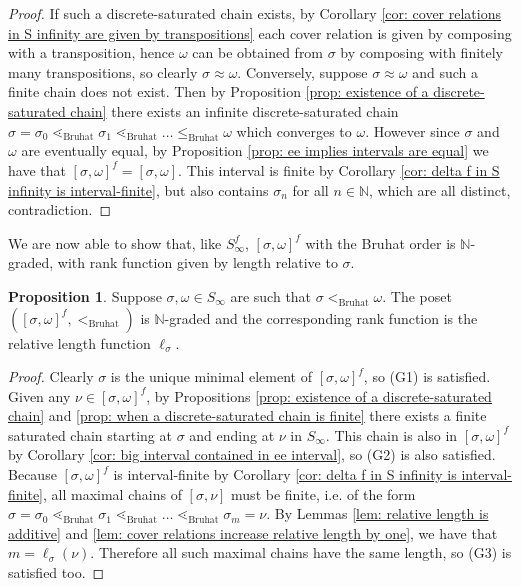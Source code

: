 \documentclass[oneside,11pt,reqno]{amsart}
\newcommand{\nn}{\ensuremath{\mathbb{N}}}
\theoremstyle{definition}
\newtheorem{proof techniques}{Proof Techniques}
\newtheorem{proposition}{Proposition}
\begin{document}
\begin{proof}
If such a discrete-saturated chain exists, by Corollary \ref{cor: cover relations in S infinity are given by transpositions} each cover relation is given by composing with a transposition, hence $\omega$ can be obtained from $\sigma$ by composing with finitely many transpositions, so clearly $\sigma \approx \omega$.
Conversely, suppose $\sigma \approx \omega$ and such a finite chain does not exist. Then by Proposition \ref{prop: existence of a discrete-saturated chain} there exists an infinite discrete-saturated chain $\sigma  = \sigma_0 \lessdot_\text{Bruhat} \sigma_1 \lessdot_\text{Bruhat} \ldots \leq_\text{Bruhat} \omega$ which converges to $\omega$. However since $\sigma$ and $\omega$ are eventually equal, by Proposition \ref{prop: ee implies intervals are equal} we have that $[\sigma , \omega]^f = [\sigma , \omega]$. This interval is finite by Corollary \ref{cor: delta f in S infinity is interval-finite}, but also contains $\sigma_n$ for all $n \in \nn$, which are all distinct, contradiction. 
\end{proof}


We are now able to show that, like $S_\infty^f$, $[\sigma , \omega]^f$ with the Bruhat order is $\nn$-graded, with rank function given by length relative to $\sigma$. 

\begin{proposition}\label{prop: bruhat interval is graded}
    Suppose $\sigma , \omega \in S_\infty$ are such that $\sigma <_\text{Bruhat} \omega$. The poset $([\sigma , \omega]^f, <_\text{Bruhat})$ is $\nn$-graded and the corresponding rank function is the relative length function $\ell_\sigma$.   
\end{proposition}

\begin{proof}
Clearly $\sigma$ is the unique minimal element of $[\sigma , \omega]^f$, so (G1) is satisfied. Given any $\nu \in [\sigma , \omega]^f$, by Propositions \ref{prop: existence of a discrete-saturated chain} and \ref{prop: when a discrete-saturated chain is finite} there exists a finite saturated chain starting at $\sigma$ and ending at $\nu$ in $S_\infty$. This chain is also in $[\sigma , \omega]^f$ by Corollary \ref{cor: big interval contained in ee interval}, so (G2) is also satisfied. Because $[\sigma , \omega]^f$ is interval-finite by Corollary \ref{cor: delta f in S infinity is interval-finite}, all maximal chains of $[\sigma , \nu]$ must be finite, i.e. of the form $\sigma = \sigma_0 \lessdot_{\text{Bruhat}} \sigma_1 \lessdot_\text{Bruhat} \ldots \lessdot_\text{Bruhat} \sigma_m = \nu$. By Lemmas \ref{lem: relative length is additive} and \ref{lem: cover relations increase relative length by one}, we have that $m = \ell_\sigma(\nu)$. Therefore all such maximal chains have the same length, so (G3) is satisfied too.
\end{proof}
\end{document}
